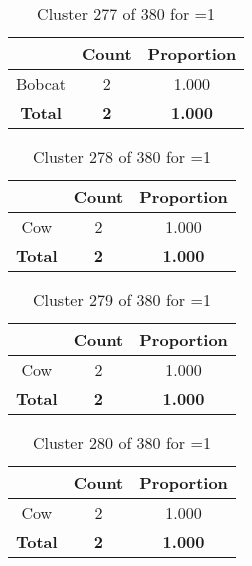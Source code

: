 \begin{table}[ht!]
\centering
\begin{tabular}{|c|c|c|}
\hline
\bf \Spec{} &\bf Count &\bf Proportion\\ \hline \hline
Bobcat & 2 & 1.000\\ \hline
\hline
\bf Total & \bf 2 & \bf 1.000\\ \hline
\end{tabular}
\label{tab:cluster:277:1}
\caption{Cluster 277 of 380 for \minneigh{}=1}
\end{table}

\begin{table}[ht!]
\centering
\begin{tabular}{|c|c|c|}
\hline
\bf \Spec{} &\bf Count &\bf Proportion\\ \hline \hline
Cow & 2 & 1.000\\ \hline
\hline
\bf Total & \bf 2 & \bf 1.000\\ \hline
\end{tabular}
\label{tab:cluster:278:1}
\caption{Cluster 278 of 380 for \minneigh{}=1}
\end{table}

\begin{table}[ht!]
\centering
\begin{tabular}{|c|c|c|}
\hline
\bf \Spec{} &\bf Count &\bf Proportion\\ \hline \hline
Cow & 2 & 1.000\\ \hline
\hline
\bf Total & \bf 2 & \bf 1.000\\ \hline
\end{tabular}
\label{tab:cluster:279:1}
\caption{Cluster 279 of 380 for \minneigh{}=1}
\end{table}

\clearpage
\begin{table}[ht!]
\centering
\begin{tabular}{|c|c|c|}
\hline
\bf \Spec{} &\bf Count &\bf Proportion\\ \hline \hline
Cow & 2 & 1.000\\ \hline
\hline
\bf Total & \bf 2 & \bf 1.000\\ \hline
\end{tabular}
\label{tab:cluster:280:1}
\caption{Cluster 280 of 380 for \minneigh{}=1}
\end{table}

